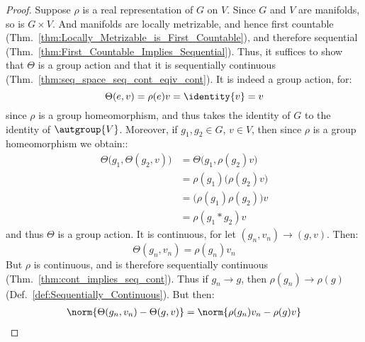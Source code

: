         \begin{proof}
            Suppose $\rho$ is a real representation of $G$ on $V$. Since $G$ and
            $V$ are manifolds, so is $G\times{V}$. And manifolds are locally
            metrizable, and hence first countable
            (Thm.~\ref{thm:Locally_Metrizable_is_First_Countable}), and
            therefore sequential
            (Thm.~\ref{thm:First_Countable_Implies_Sequential}). Thus, it
            suffices to show that $\Theta$ is a group action and that it is
            sequentially continuous
            (Thm.~\ref{thm:seq_space_seq_cont_eqiv_cont}). It is indeed a group
            action, for:
            \begin{equation}
                \Theta(e,v)=\rho(e)v=\identity{v}=v
            \end{equation}
            since $\rho$ is a group homeomorphism, and thus takes the identity
            of $G$ to the identity of $\autgroup{V}$. Moreover, if
            $g_{1},g_{2}\in{G}$, $v\in{V}$, then since $\rho$ is a group
            homeomorphism we obtain::
            \begin{subequations}
                \begin{align}
                    \Theta\big(g_{1},\Theta(g_{2},v)\big)
                        &=\Theta\big(g_{1},\rho(g_{2})v\big)\\
                        &=\rho(g_{1})\big(\rho(g_{2})v\big)\\
                        &=\big(\rho(g_{1})\rho(g_{2})\big)v\\
                        &=\rho(g_{1}*g_{2})v
                \end{align}
            \end{subequations}
            and thus $\Theta$ is a group action. It is continuous, for let
            $(g_{n},v_{n})\rightarrow(g,v)$. Then:
            \begin{equation}
                \Theta(g_{n},v_{n})=\rho(g_{n})v_{n}
            \end{equation}
            But $\rho$ is continuous, and is therefore sequentially continuous
            (Thm.~\ref{thm:cont_implies_seq_cont}). Thus if
            $g_{n}\rightarrow{g}$, then $\rho(g_{n})\rightarrow\rho(g)$
            (Def.~\ref{def:Sequentially_Continuous}). But then:
            \begin{subequations}
                \begin{align}
                    \norm{\Theta(g_{n},v_{n})-\Theta(g,v)}
                    &=\norm{\rho(g_{n})v_{n}-\rho(g)v}\\

\end{align}
\end{subequations}
\end{proof}
